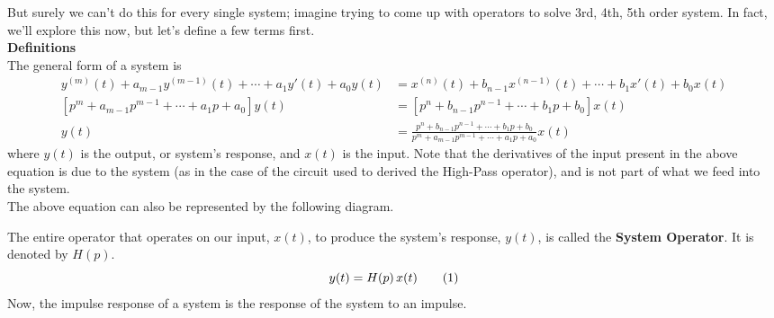 \documentclass{report}
\begin{document}
But surely we can't do this for every single system; imagine trying to come up with operators to solve 3rd, 4th, 5th order system. In fact, we'll explore this now, but let's define a few terms first. \smallskip \\

\textbf{Definitions}\\
The general form of a system is
\begin{align*}
    {y^{\left( m \right)}\left( t \right)} + {a_{m - 1}}{y^{\left( {m - 1} \right)}\left( t \right)} +  \cdots  + {a_1}y'\left( t \right) + {a_0}y\left( t \right) &= {x^{\left( n \right)}\left( t \right)} + {b_{n - 1}}{x^{\left( {n - 1} \right)}\left( t \right)} +  \cdots  + {b_1}x'\left( t \right) + {b_0}x\left( t \right) \\
    \left[{p^m} + {a_{m - 1}}{p^{m - 1}} +  \cdots  + {a_1}p + {a_0}\right]y(t) &= \left[{p^n} + {b_{n - 1}}{p^{n - 1}} +  \cdots  + {b_1}p + {b_0}\right]x(t)\\
    y(t) &= \frac{{p^n} + {b_{n - 1}}{p^{n - 1}} +  \cdots  + {b_1}p + {b_0}}{{p^m} + {a_{m - 1}}{p^{m - 1}} +  \cdots  + {a_1}p + {a_0}}x(t)
\end{align*}
where $y(t)$ is the output, or system's response, and $x(t)$ is the input. Note that the derivatives of the input present in the above equation is due to the system (as in the case of the circuit used to derived the High-Pass operator), and is not part of what we feed into the system. \\
The above equation can also be represented by the following diagram.
\begin{figure}[H]
    \centering
{}
\end{figure}
The entire operator that operates on our input, $x(t)$, to produce the system's response, $y(t)$, is called the \textbf{System Operator}. It is denoted by $H(p)$. 
\begin{equation*}
    y(t) = H(p)\,x(t) \numberthis \label{eq571}
\end{equation*}
Now, the impulse response of a system is the response of the system to an impulse.
\end{document}
